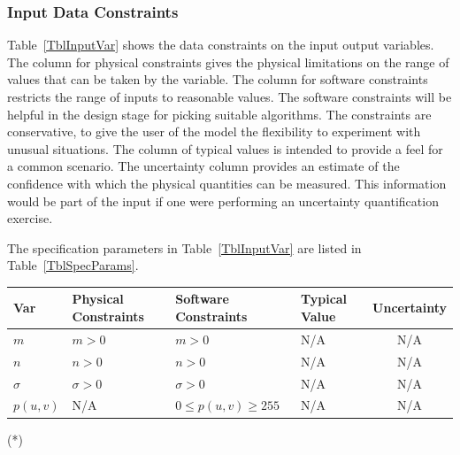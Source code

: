 \documentclass[12pt]{article}
\begin{document}
\subsubsection{Input Data Constraints} \label{sec_DataConstraints}    

Table~\ref{TblInputVar} shows the data constraints on the input output
variables.  The column for physical constraints gives the physical limitations
on the range of values that can be taken by the variable.  The column for
software constraints restricts the range of inputs to reasonable values.  The
software constraints will be helpful in the design stage for picking suitable
algorithms.  The constraints are conservative, to give the user of the model the
flexibility to experiment with unusual situations.  The column of typical values
is intended to provide a feel for a common scenario.  The uncertainty column
provides an estimate of the confidence with which the physical quantities can be
measured.  This information would be part of the input if one were performing an
uncertainty quantification exercise.

The specification parameters in Table~\ref{TblInputVar} are listed in
Table~\ref{TblSpecParams}.

\begin{table}[!h]
  \caption{Input Variables} \label{TblInputVar}
  \renewcommand{\arraystretch}{1.2}
\noindent \begin{longtable*}{l l l l c} 
  \toprule
  \textbf{Var} & \textbf{Physical Constraints} & \textbf{Software Constraints} &
                             \textbf{Typical Value} & \textbf{Uncertainty}\\
  \midrule 
  $m$ & $m > 0$ & $m > 0 $ & N/A & N/A  %
  \\
  $n$ & $n > 0$ & $n> 0 $ & N/A & N/A  %
  \\
  $\sigma$ & $\sigma > 0$ & $\sigma > 0 $ & N/A & N/A %
  \\
  $p(u,v)$ & N/A & $0 \leq p(u,v) \geq 255$ & N/A & N/A %
  \\
  \bottomrule
\end{longtable*}
\end{table}

\noindent 
\begin{description}
\item[(*)] 
\end{description}
\end{document}
